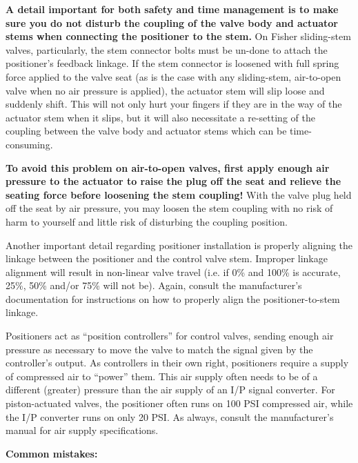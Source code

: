 \vskip 10pt

{\bf A detail important for both safety and time management is to make sure you do not disturb the coupling of the valve body and actuator stems when connecting the positioner to the stem.}  On Fisher sliding-stem valves, particularly, the stem connector bolts must be un-done to attach the positioner's feedback linkage.  If the stem connector is loosened with full spring force applied to the valve seat (as is the case with any sliding-stem, air-to-open valve when no air pressure is applied), the actuator stem will slip loose and suddenly shift.  This will not only hurt your fingers if they are in the way of the actuator stem when it slips, but it will also necessitate a re-setting of the coupling between the valve body and actuator stems which can be time-consuming.

{\bf To avoid this problem on air-to-open valves, first apply enough air pressure to the actuator to raise the plug off the seat and relieve the seating force before loosening the stem coupling!}  With the valve plug held off the seat by air pressure, you may loosen the stem coupling with no risk of harm to yourself and little risk of disturbing the coupling position.

Another important detail regarding positioner installation is properly aligning the linkage between the positioner and the control valve stem.  Improper linkage alignment will result in non-linear valve travel (i.e. if 0\% and 100\% is accurate, 25\%, 50\% and/or 75\% will not be).  Again, consult the manufacturer's documentation for instructions on how to properly align the positioner-to-stem linkage.

\vskip 10pt

Positioners act as ``position controllers'' for control valves, sending enough air pressure as necessary to move the valve to match the signal given by the controller's output.  As controllers in their own right, positioners require a supply of compressed air to ``power'' them.  This air supply often needs to be of a different (greater) pressure than the air supply of an I/P signal converter.  For piston-actuated valves, the positioner often runs on 100 PSI compressed air, while the I/P converter runs on only 20 PSI.  As always, consult the manufacturer's manual for air supply specifications.

\vskip 10pt

{\bf Common mistakes:}


